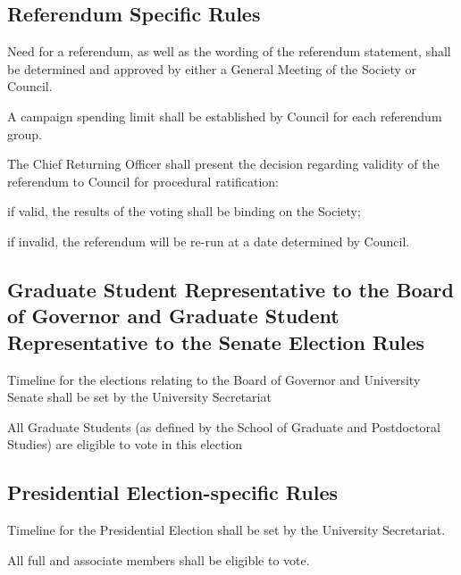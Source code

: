 \subsection{Referendum Specific Rules}
\begin{longenum}[ label*=\thesubsection.\arabic*., align=left]
	\item Need for a referendum, as well as the wording of the referendum statement, shall be determined and approved by either a General Meeting of the Society or Council. 
    \item A campaign spending limit shall be established by Council for each referendum group.
    \item The Chief Returning Officer shall present the decision regarding validity of the referendum to Council for procedural ratification: 
    \begin{longenum}[ label*=\arabic*., align=left]
		\item if valid, the results of the voting shall be binding on the Society;
        \item if invalid, the referendum will be re-run at a date determined by Council.
	\end{longenum}
    
\end{longenum}

\subsection{Graduate Student Representative to the Board of Governor and Graduate Student Representative to the Senate Election Rules}
\begin{longenum}[ label*=\thesubsection.\arabic*., align=left]
 
\item Timeline for the elections relating to the Board of Governor and University Senate
shall be set by the University Secretariat
\item  All Graduate Students (as defined by the School of Graduate and Postdoctoral Studies) are eligible to vote in this election
\end{longenum}


\subsection{Presidential Election-specific Rules}
\begin{longenum}[ label*=\thesubsection.\arabic*., align=left]
	\item Timeline for the Presidential Election shall be set by the University Secretariat.
    \item All full and associate members shall be eligible to vote. 
\end{longenum}


